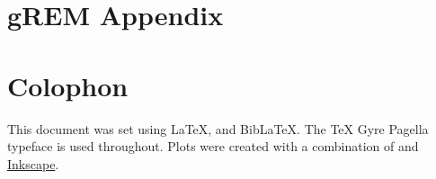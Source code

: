 
\appendix
\chapter{gREM Appendix}
\label{appendixlabel1}




\chapter{Colophon}
\label{appendixlabel3}

This document was set using \LaTeX, \XeLaTeX\vspace{1mm} and Bib\LaTeX.
The TeX Gyre Pagella typeface is used throughout.
Plots were created with a combination of \cite{ggplot2, palettetown, ggtree} and \href{www.inkscape.org}{Inkscape}.

